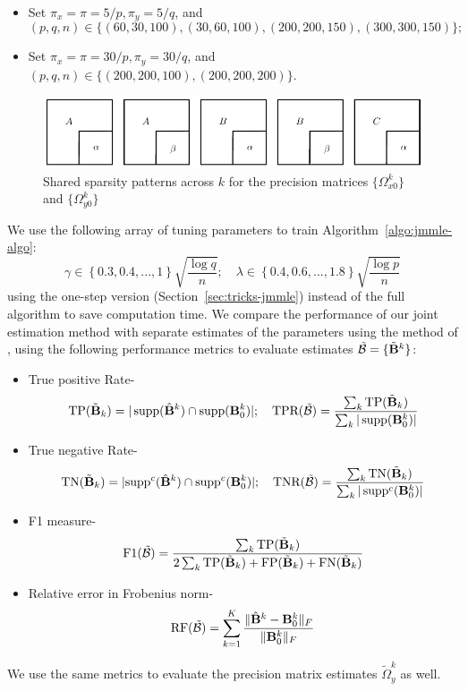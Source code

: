 \begin{itemize}
\item Set $\pi_x = \pi = 5/p, \pi_y = 5/q$, and
%
$$
(p,q,n) \in \{ (60,30,100), (30,60,100), (200,200,150), (300,300,150) \};
$$

\item Set $\pi_x = \pi = 30/p, \pi_y = 30/q$, and $(p,q,n) \in  \{ (200,200,100), (200,200,200) \}$.
\end{itemize}
%

\begin{figure}
\centering
\includegraphics{omega-structure}
\caption{Shared sparsity patterns across $k$ for the precision matrices $\{ \Omega_{x0}^k\}$ and $\{ \Omega_{y0}^k\}$}
\label{fig:sim-structure}
\end{figure}

We use the following array of tuning parameters to train Algorithm~\ref{algo:jmmle-algo}:
%
$$
\gamma \in \left\{ 0.3, 0.4, ..., 1 \right\} \sqrt{\frac{\log q}{n}}; \quad
\lambda \in \left\{ 0.4, 0.6, ..., 1.8 \right\} \sqrt{\frac{\log p}{n}}
$$
%
using the one-step version (Section~\ref{sec:tricks-jmmle}) instead of the full algorithm to save computation time. We compare the performance of our joint estimation method with separate estimates of the parameters using the method of \cite{LinEtal16}, using the following performance metrics to evaluate estimates $\tilde {{\cal{B}}} = \{ \tilde {{\mathbf{B}}}^k \}$:

\begin{itemize}
\item True positive Rate-
%
\[
\text{TP}(\tilde {{\mathbf{B}}}_k) = | \operatorname*{supp}(\hat {{\mathbf{B}}}^k) \cap \operatorname*{supp} ({\mathbf{B}}_0^k)|; \quad
\text{TPR} (\tilde {{\cal{B}}}) = \frac{\sum_k \text{TP}(\tilde {{\mathbf{B}}}_k) }{\sum_k | \operatorname*{supp} ({\mathbf{B}}_0^k)| }
\]
\item True negative Rate-
%
\[
\text{TN}(\tilde {{\mathbf{B}}}_k) = | {\operatorname*{supp}}^c (\hat {{\mathbf{B}}}^k) \cap {\operatorname*{supp}}^c ({\mathbf{B}}_0^k)|; \quad
\text{TNR} (\tilde {{\cal{B}}}) = \frac{\sum_k \text{TN}(\tilde {{\mathbf{B}}}_k) }{\sum_k | \operatorname*{supp}^c ({\mathbf{B}}_0^k)| }
\]
%
\item F1 measure-
%
\[
\text{F1} (\tilde {{\cal{B}}}) = \frac{ \sum_k \text{TP}(\tilde {{\mathbf{B}}}_k)}
{2 \sum_k \text{TP}(\tilde {{\mathbf{B}}}_k) + \text{FP}(\tilde {{\mathbf{B}}}_k) + \text{FN}(\tilde {{\mathbf{B}}}_k)}
\]
%
\item Relative error in Frobenius norm-
%
\[
\text{RF} (\tilde {{\cal{B}}}) = \sum_{k=1}^K \frac{\| \hat {{\mathbf{B}}}^k - {\mathbf{B}}_0^k \|_F}{\| {\mathbf{B}}_0^k \|_F}
\]
%
\end{itemize}
%
We use the same metrics to evaluate the precision matrix estimates $\tilde \Omega_y^k$ as well.

